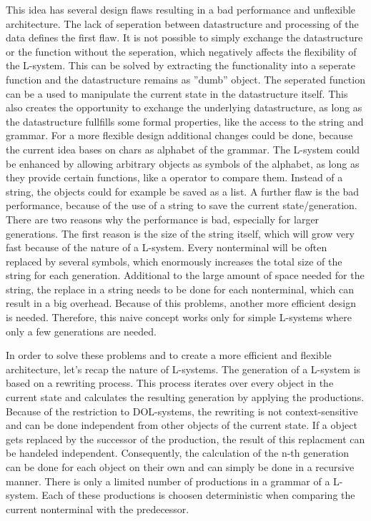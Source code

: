 \documentclass[english]{cpp-hmwk}
\begin{document}
\medskip
\noindent This idea has several design flaws resulting in a bad performance and unflexible architecture. The lack of seperation between datastructure and processing of the data defines the first flaw. It is not possible to simply exchange the datastructure or the function without the seperation, which negatively affects the flexibility of the L-system. This can be solved by extracting the functionality into a seperate function and the datastructure remains as ''dumb'' object. The seperated function can be a used to manipulate the current state in the datastructure itself. This also creates the opportunity to exchange the underlying datastructure, as long as the datastructure fullfills some formal properties, like the access to the string and grammar.\newline
For a more flexible design additional changes could be done, because the current idea bases on chars as alphabet of the grammar. The L-system could be enhanced by allowing arbitrary objects as symbols of the alphabet, as long as they provide certain functions, like a operator to compare them. Instead of a string, the objects could for example be saved as a list.\newline
A further flaw is the bad performance, because of the use of a string to save the current state/generation. There are two reasons why the performance is bad, especially for larger generations. The first reason is the size of the string itself, which will grow very fast because of the nature of a L-system. Every nonterminal will be often replaced by several symbols, which enormously increases the total size of the string for each generation. Additional to the large amount of space needed for the string, the replace in a string needs to be done for each nonterminal, which can result in a big overhead. Because of this problems, another more efficient design is needed.\newline
Therefore, this naive concept works only for simple L-systems where only a few generations are needed.

\medskip
\noindent In order to solve these problems and to create a more efficient and flexible architecture, let's recap the nature of L-systems. The generation of a L-system is based on a rewriting process. This process iterates over every object in the current state and calculates the resulting generation by applying the productions. Because of the restriction to DOL-systems, the rewriting is not context-sensitive and can be done independent from other objects of the current state. If a object gets replaced by the successor of the production, the result of this replacment can be handeled independent. Consequently, the calculation of the n-th generation can be done for each object on their own and can simply be done in a recursive manner.\newline
There is only a limited number of productions in a grammar of a L-system. Each of these productions is choosen deterministic when comparing the current nonterminal with the predecessor. 
\end{document}
